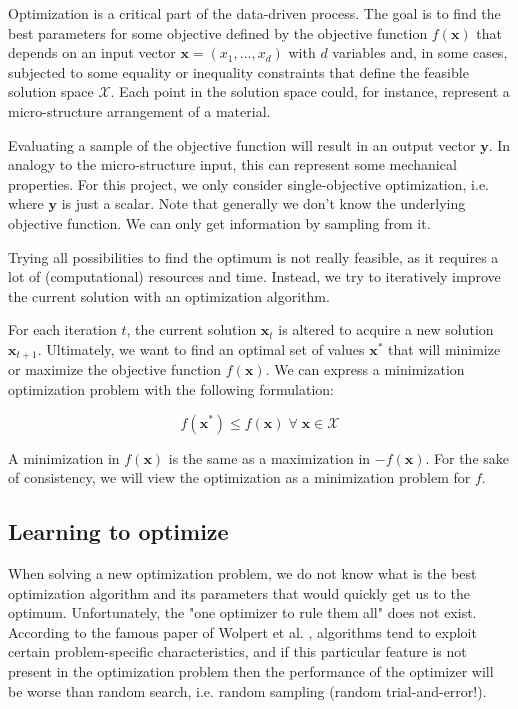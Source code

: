 \documentclass[10pt,a4paper,twoside]{article} %
\begin{document}
Optimization is a critical part of the data-driven process.
The goal is to find the best parameters for some objective defined by the objective function $f(\mathbf{x})$ that depends on an input vector $\mathbf{x} = (x_{1}, ... , x_{d})$ with $d$ variables and, in some cases, subjected to some equality or inequality constraints that define the feasible solution space $\mathcal{X}$. Each point in the solution space could, for instance, represent a micro-structure arrangement of a material.

Evaluating a sample of the objective function will result in an output vector $\mathbf{y}$. In analogy to the micro-structure input, this can represent some mechanical properties. For this project, we only consider single-objective optimization, i.e. where $\mathbf{y}$ is just a scalar. Note that generally we don't know the underlying objective function. We can only get information by sampling from it.

Trying all possibilities to find the optimum is not really feasible, as it requires a lot of (computational) resources and time. Instead, we try to iteratively improve the current solution with an optimization algorithm.

For each iteration $t$, the current solution $\mathbf{x}_{t}$ is altered to acquire a new solution $\mathbf{x}_{t+1}$. Ultimately, we want to find an optimal set of values $\mathbf{x}^{*}$ that will minimize or maximize the objective function $f(\mathbf{x})$. We can express a minimization optimization problem with the following formulation:

\begin{equation}
f(\mathbf{x}^{*}) \leq f(\mathbf{x}) \; \forall \; \mathbf{x} \in \mathcal{X}
\end{equation}

A minimization in $f(\mathbf{x})$ is the same as a maximization in $-f(\mathbf{x})$. For the sake of consistency, we will view the optimization as a minimization problem for $f$. 

\subsection*{Learning to optimize}

When solving a new optimization problem, we do not know what is the best optimization algorithm and its parameters that would quickly get us to the optimum. Unfortunately, the "one optimizer to rule them all" does not exist. According to the famous paper of Wolpert et al. \cite{Wolpert1997}, algorithms tend to exploit certain problem-specific characteristics, and if this particular feature is not present in the optimization problem then the performance of the optimizer will be worse than random search, i.e. random sampling (random trial-and-error!).
\end{document}

